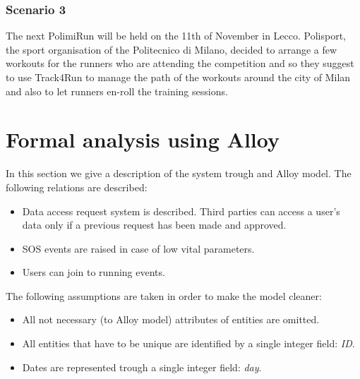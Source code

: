 \documentclass{article}
\begin{document}
	\subsubsection{Scenario 3}
	The next PolimiRun will be held on the 11th of November in Lecco.
	Polisport, the sport organisation of the Politecnico di Milano, 
	decided to arrange a few workouts for the runners who are 
	attending the competition and so they suggest to use Track4Run to
	manage the path of the workouts around the city of Milan and also
	to let runners en-roll the training sessions. 

\section{Formal analysis using Alloy}

In this section we give a description of the system trough and Alloy model.
The following relations are described:
\begin{itemize}
	\item Data access request system is described. Third parties can access a user's data only
		if a previous request has been made and approved.
	\item SOS events are raised in case of low vital parameters.
	\item Users can join to running events.
\end{itemize}
The following assumptions are taken in order to make the model cleaner:
\begin{itemize}
	\item All not necessary (to Alloy model) attributes of entities are omitted.
	\item All entities that have to be unique are identified by a single integer field: \textit{ID}.
	\item Dates are represented trough a single integer field: \textit{day}.
\end{itemize}
\end{document}
